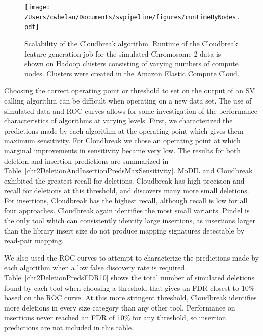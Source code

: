 \documentclass [11pt] {report}
\newcommand{\todo}[1]{}
\begin{document}
\begin{figure}
\centering
\texttt{[image: /Users/cwhelan/Documents/svpipeline/figures/runtimeByNodes.pdf]}
\caption{Scalability of the Cloudbreak algorithm. Runtime of the Cloudbreak feature generation job for the simulated Chromosome 2 data is shown on Hadoop clusters consisting of varying numbers of compute nodes. Clusters were created in the Amazon Elastic Compute Cloud.}
\label{scalability}
\end{figure}

Choosing the correct operating point or threshold to set on the output of an SV calling algorithm can be difficult when operating on a new data set. The use of simulated data and ROC curves allows for some investigation of the performance characteristics of algorithms at varying levels. First, we characterized the predictions made by each algorithm at the operating point which gives them maximum sensitivity. For Cloudbreak we chose an operating point at which marginal improvements in sensitivity became very low. The results for both deletion and insertion predictions are summarized in Table~\ref{chr2DeletionAndInsertionPredsMaxSensitivity}. MoDIL and Cloudbreak exhibited the greatest recall for deletions. Cloudbreak has high precision and recall for deletions at this threshold, and discovers many more small deletions. For insertions, Cloudbreak has the highest recall, although recall is low for all four approaches. Cloudbreak again identifies the most small variants. Pindel is the only tool which can consistently identify large insertions, as insertions larger than the library insert size do not produce mapping signatures detectable by read-pair mapping. 

We also used the ROC curves to attempt to characterize the predictions made by each algorithm when a low false discovery rate is required. Table~\ref{chr2DeletionPredsFDR10} shows the total number of simulated deletions found by each tool when choosing a threshold that gives an FDR closest to 10\% based on the ROC curve. At this more stringent threshold, Cloudbreak identifies more deletions in every size category than any other tool. Performance on insertions never reached an FDR of 10\% for any threshold, so insertion predictions are not included in this table. \todo{We also examined Cloudbreak's ability to detect events in repetitive regions of the genome, and found that it was similar to the other methods tested (Tables~\ref{deletionRepmaskpreds} and~\ref{insertionRepmaskpreds}).}
\end{document}
